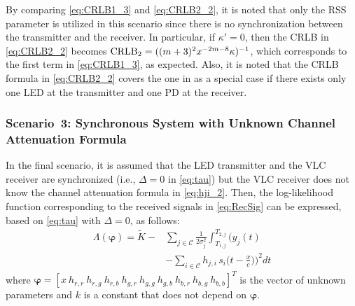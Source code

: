 \documentclass[10pt,twocolumn]{IEEEtran}
\newcommand{\CRLB}{{\rm{CRLB}}}
\newcommand{\bvp}{{\boldsymbol{\varphi}}}
\newcommand{\mtC}{{\mathcal{C}}}
\begin{document}
By comparing \eqref{eq:CRLB1_3} and \eqref{eq:CRLB2_2}, it is noted that only the RSS parameter is utilized in this scenario since there is no synchronization between the transmitter and the receiver. In particular, if $\kappa'=0$, then the CRLB in \eqref{eq:CRLB2_2} becomes $\CRLB_2=((m+3)^2x^{-2m-8}\kappa)^{-1}$, which corresponds to the first term in \eqref{eq:CRLB1_3}, as expected. Also, it is noted that the CRLB formula in \eqref{eq:CRLB2_2} covers the one in \cite[Sec.~III-B]{MFK_CRLB} as a special case if there exists only one LED at the transmitter and one PD at the receiver.


\subsubsection{Scenario~3: Synchronous System with Unknown Channel Attenuation Formula}\label{sec:Case3}

In the final scenario, it is assumed that the LED transmitter and the VLC receiver are synchronized (i.e., $\Delta=0$ in \eqref{eq:tau}) but the VLC receiver does not know the channel attenuation formula in \eqref{eq:hji_2}. Then, the log-likelihood function corresponding to the received signals in \eqref{eq:RecSig} can be expressed, based on \eqref{eq:tau} with $\Delta=0$, as follows:
\begin{align}\label{eq:loglike3}
\Lambda(\bvp) = \tilde{K} - &\sum_{j\in\mtC}  \frac{1}{2\sigma_j^2}\int_{T_{1,j}}^{T_{2,j}}
\bigg(y_j(t)
\\\nonumber
&-\sum_{i\in\mtC}h_{j,i}\,s_i\Big(t-\frac{x}{c}\Big)\bigg)^2dt
\end{align}
where $\bvp=[x~h_{r,r}~h_{r,g}~h_{r,b}~h_{g,r}~h_{g,g}~h_{g,b}~h_{b,r}~h_{b,g}~h_{b,b}]^T$ is the vector of unknown parameters and $k$ is a constant that does not depend on $\bvp$.
\end{document}
